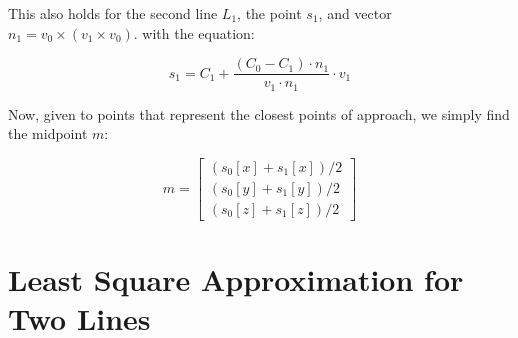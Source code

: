 This also holds for the second line $L_1$, the point $s_1$, and vector $n_1 = v_0 \times (v_1 \times v_0)$.
with the equation:

\[
s_1 = C_1 + \frac{(C_0 - C_1) \cdot n_1}{v_1 \cdot n_1} \cdot v_1
\]

Now, given to points that represent the closest points of approach, we simply find the midpoint $m$:

\[
m = \begin{bmatrix}
  (s_0[x] + s_1[x])/2\\
  (s_0[y] + s_1[y])/2\\
  (s_0[z] + s_1[z])/2
\end{bmatrix}
\]

\section{Least Square Approximation for Two Lines}
